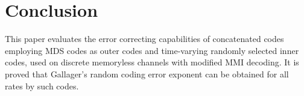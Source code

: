 \chapter{Conclusion}
This paper evaluates the error 
correcting capabilities of concatenated codes 
employing MDS codes as outer codes and
time-varying randomly selected inner codes,
used on discrete memoryless channels with modified MMI
decoding. It is proved that 
Gallager's random coding error exponent
can be obtained for all rates by such codes.
